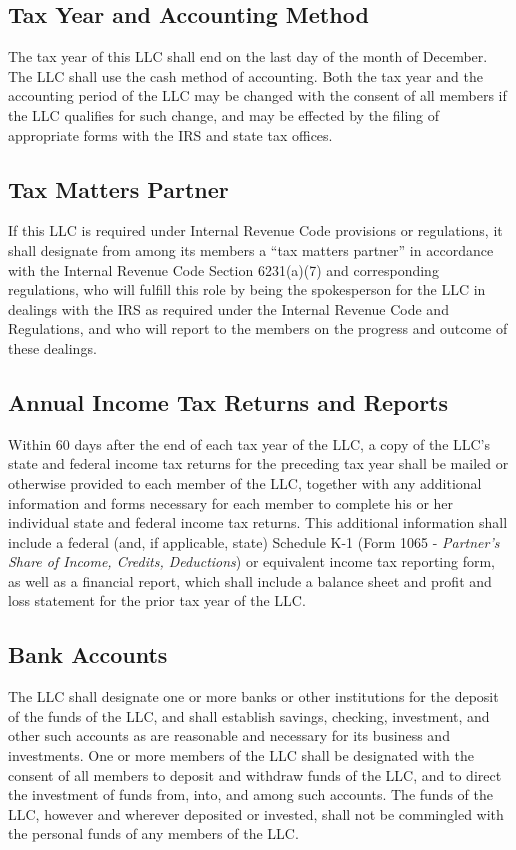 \documentclass{article}
\begin{document}
		\subsection{Tax Year and Accounting Method}
		The tax year of this LLC shall end on the last day of the month of December. The LLC shall use the cash method of accounting. Both the tax year and the accounting period of the LLC may be changed with the consent of all members if the LLC qualifies for such change, and may be effected by the filing of appropriate forms with the IRS and state tax offices.

		\subsection{Tax Matters Partner}
		If this LLC is required under Internal Revenue Code provisions or regulations, it shall designate from among its members a “tax matters partner” in accordance with the Internal Revenue Code Section 6231(a)(7) and corresponding regulations, who will fulfill this role by being the spokesperson for the LLC in dealings with the IRS as required under the Internal Revenue Code and Regulations, and who will report to the members on the progress and outcome of these dealings.

		\subsection{Annual Income Tax Returns and Reports}
		Within 60 days after the end of each tax year of the LLC, a copy of the LLC's state and federal income tax returns for the preceding tax year shall be mailed or otherwise provided to each member of the LLC, together with any additional information and forms necessary for each member to complete his or her individual state and federal income tax returns. This additional information shall include a federal (and, if applicable, state) Schedule K-1 (Form 1065 - \emph{Partner's Share of Income, Credits, Deductions}) or equivalent income tax reporting form, as well as a financial report, which shall include a balance sheet and profit and loss statement for the prior tax year of the LLC.

		\subsection{Bank Accounts}
		The LLC shall designate one or more banks or other institutions for the deposit of the funds of the LLC, and shall establish savings, checking, investment, and other such accounts as are reasonable and necessary for its business and investments. One or more members of the LLC shall be designated with the consent of all members to deposit and withdraw funds of the LLC, and to direct the investment of funds from, into, and among such accounts. The funds of the LLC, however and wherever deposited or invested, shall not be commingled with the personal funds of any members of the LLC.
\end{document}
